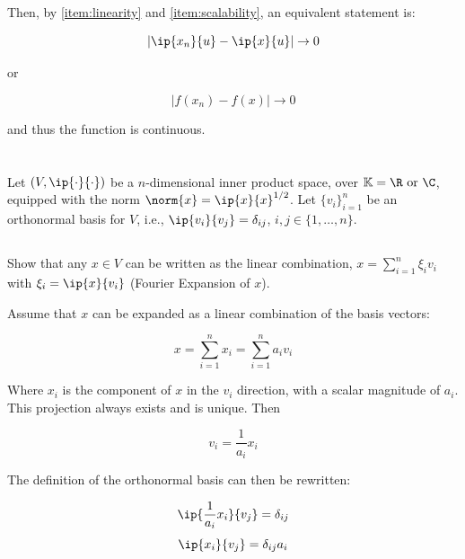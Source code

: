 \documentclass{template}
\begin{document}
Then, by \autoref{item:linearity} and \autoref{item:scalability}, an equivalent statement is:

\begin{equation}
    |\ip{x_n}{u} - \ip{x}{u}| \rightarrow 0
\end{equation}

or

\begin{equation}
    |f(x_n) - f(x)| \rightarrow 0
\end{equation}

and thus the function is continuous.

\newpage
\section{}

Let $(V, \ip{\cdot}{\cdot})$ be a $n$-dimensional inner product space, over $\mathbb{K} = \R \text{ or } \C$, equipped with the  norm $\norm{x} = \ip{x}{x}^{1/2}$. Let $\{v_i\}_{i=1}^n$ be an orthonormal basis for $V$, i.e., $\ip{v_i}{v_j} = \delta_{ij}$, $i, j \in \{1, \ldots, n\}$.

\subsection{}\label{sec:fourier-expansion}

Show that any $x \in V$ can be written as the linear combination, $x = \sum_{i = 1}^n \xi_i v_i$ with $\xi_i = \ip{x}{v_i}$ (Fourier Expansion of $x$).

Assume that $x$ can be expanded as a linear combination of the basis vectors:

\begin{equation}
    x = \sum_{i=1}^n x_i = \sum_{i=1}^n a_i v_i
\end{equation}

Where  $x_i$ is the component of $x$ in the $v_i$ direction, with a scalar magnitude of $a_i$. This projection always exists and is unique. Then

\begin{equation}
    v_i = \frac{1}{a_i} x_i
\end{equation}

The definition of the orthonormal basis can then be rewritten:

\begin{equation}
    \ip{\frac{1}{a_i} x_i}{v_j} = \delta_{ij}
\end{equation}
\begin{equation}
    \ip{x_i}{v_j} = \delta_{ij}a_i
\end{equation}
\end{document}
